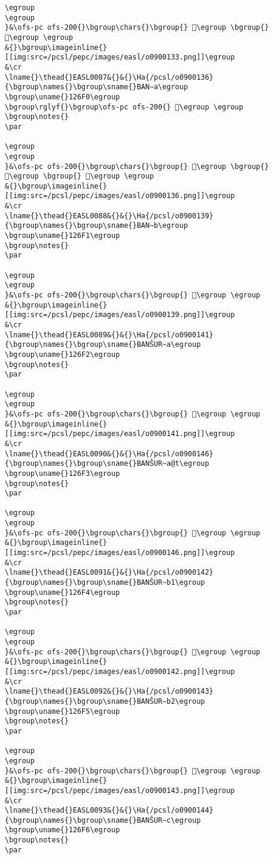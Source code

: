 \begin{verbatim}
\egroup
\egroup
}&\ofs-pc ofs-200{}\bgroup\chars{}\bgroup{} 𒛬\egroup \bgroup{} 𒛭\egroup \egroup
&{}\bgroup\imageinline{}[[img:src=/pcsl/pepc/images/easl/o0900133.png]]\egroup
&\cr
\lname{}\thead{}EASL0087&{}&{}\Ha{/pcsl/o0900136}{\bgroup\names{}\bgroup\sname{}BAN∼a\egroup
\bgroup\uname{}126F0\egroup
\bgroup\rglyf{}\bgroup\ofs-pc ofs-200{} 𒛰\egroup \egroup
\bgroup\notes{}
\par 

\egroup
\egroup
}&\ofs-pc ofs-200{}\bgroup\chars{}\bgroup{} 𒛮\egroup \bgroup{} 𒛯\egroup \bgroup{} 𒛰\egroup \egroup
&{}\bgroup\imageinline{}[[img:src=/pcsl/pepc/images/easl/o0900136.png]]\egroup
&\cr
\lname{}\thead{}EASL0088&{}&{}\Ha{/pcsl/o0900139}{\bgroup\names{}\bgroup\sname{}BAN∼b\egroup
\bgroup\uname{}126F1\egroup
\bgroup\notes{}
\par 

\egroup
\egroup
}&\ofs-pc ofs-200{}\bgroup\chars{}\bgroup{} 𒛱\egroup \egroup
&{}\bgroup\imageinline{}[[img:src=/pcsl/pepc/images/easl/o0900139.png]]\egroup
&\cr
\lname{}\thead{}EASL0089&{}&{}\Ha{/pcsl/o0900141}{\bgroup\names{}\bgroup\sname{}BANŠUR∼a\egroup
\bgroup\uname{}126F2\egroup
\bgroup\notes{}
\par 

\egroup
\egroup
}&\ofs-pc ofs-200{}\bgroup\chars{}\bgroup{} 𒛲\egroup \egroup
&{}\bgroup\imageinline{}[[img:src=/pcsl/pepc/images/easl/o0900141.png]]\egroup
&\cr
\lname{}\thead{}EASL0090&{}&{}\Ha{/pcsl/o0900146}{\bgroup\names{}\bgroup\sname{}BANŠUR∼a@t\egroup
\bgroup\uname{}126F3\egroup
\bgroup\notes{}
\par 

\egroup
\egroup
}&\ofs-pc ofs-200{}\bgroup\chars{}\bgroup{} 𒛳\egroup \egroup
&{}\bgroup\imageinline{}[[img:src=/pcsl/pepc/images/easl/o0900146.png]]\egroup
&\cr
\lname{}\thead{}EASL0091&{}&{}\Ha{/pcsl/o0900142}{\bgroup\names{}\bgroup\sname{}BANŠUR∼b1\egroup
\bgroup\uname{}126F4\egroup
\bgroup\notes{}
\par 

\egroup
\egroup
}&\ofs-pc ofs-200{}\bgroup\chars{}\bgroup{} 𒛴\egroup \egroup
&{}\bgroup\imageinline{}[[img:src=/pcsl/pepc/images/easl/o0900142.png]]\egroup
&\cr
\lname{}\thead{}EASL0092&{}&{}\Ha{/pcsl/o0900143}{\bgroup\names{}\bgroup\sname{}BANŠUR∼b2\egroup
\bgroup\uname{}126F5\egroup
\bgroup\notes{}
\par 

\egroup
\egroup
}&\ofs-pc ofs-200{}\bgroup\chars{}\bgroup{} 𒛵\egroup \egroup
&{}\bgroup\imageinline{}[[img:src=/pcsl/pepc/images/easl/o0900143.png]]\egroup
&\cr
\lname{}\thead{}EASL0093&{}&{}\Ha{/pcsl/o0900144}{\bgroup\names{}\bgroup\sname{}BANŠUR∼c\egroup
\bgroup\uname{}126F6\egroup
\bgroup\notes{}
\par 


\end{verbatim}
